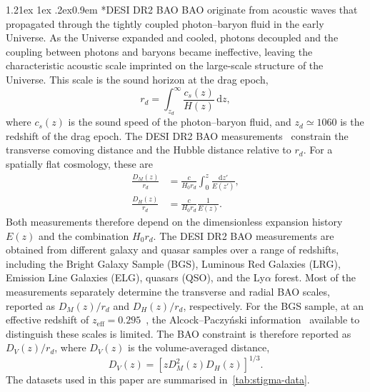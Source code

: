 \documentclass[aps,prd,reprint,preprintnumbers,showpacs,floatfix,nofootinbib,superscriptaddress]{revtex4-2}
\makeatletter
\renewcommand{\paragraph}{%
\@startsection{paragraph}{4}%
{\z@}{1.21ex \@plus 1ex \@minus .2ex}{0.9em}%
{\normalfont\normalsize\bfseries}%
}
\newcommand{\dd}{\mathrm{d}}
\makeatother
\begin{document}
\paragraph*{DESI DR2 BAO} BAO originate from acoustic waves that propagated through the tightly coupled photon--baryon fluid in the early Universe. As the Universe expanded and cooled, photons decoupled and the coupling between photons and baryons became ineffective, leaving the characteristic acoustic scale imprinted on the large-scale structure of the Universe. This scale is the sound horizon at the drag epoch,
\begin{equation}
  r_d = \int_{z_d}^\infty \frac{c_s(z)}{H(z)}\, \dd z,
  \label{eq:soundhorizon}
\end{equation}
where $c_s(z)$ is the sound speed of the photon--baryon fluid, and $z_d\simeq1060$ is the redshift of the drag epoch. 
The DESI DR2 BAO measurements~\citep{DESI:2024uvr,DESI:2024mwx,DESI:2025zgx,DESI:2025zpo} constrain the transverse comoving distance and the Hubble distance relative to $r_d$. For a spatially flat cosmology, these are
\begin{align}
		\frac{D_M(z)}{r_d} &= \frac{c}{H_0 r_d} \int_0^z \frac{\mathrm{d}z'}{E(z')},\\
		\frac{D_H(z)}{r_d} &= \frac{c}{H_0 r_d}\frac{1}{E(z)}.
		\label{eq:BAOmeasure}
\end{align}
Both measurements therefore depend on the dimensionless expansion history $E(z)$ and the combination $H_0r_d$.
The DESI DR2 BAO measurements are obtained from different galaxy and quasar samples over a range of redshifts, including the Bright Galaxy Sample (BGS), Luminous Red Galaxies (LRG), Emission Line Galaxies (ELG), quasars (QSO), and the Ly$\alpha$ forest. Most of the measurements separately determine the transverse and radial BAO scales, reported as $D_M(z)/r_d$ and $D_H(z)/r_d$, respectively. For the BGS sample, at an effective redshift of $z_\mathrm{eff}=0.295$~\citep{DESI:2025zgx}, the Alcock--Paczy\'nski information~\citep{Alcock:1979mp} available to distinguish these scales is limited. The BAO constraint is therefore reported as $D_V(z)/r_d$, where $D_V(z)$ is the volume-averaged distance,
\begin{equation}
		D_V(z) = \left[z D_M^2(z)D_H(z)\right]^{1/3}.
		\label{eq:DV}
\end{equation}
The datasets used in this paper are summarised in~\cref{tab:stigma-data}.
\end{document}
